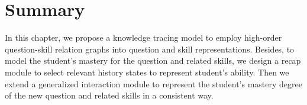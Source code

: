 \section{Summary}
In this chapter, we propose a knowledge tracing model to employ high-order question-skill relation graphs into question and skill representations. Besides, to model the student's mastery for the question and related skills, we design a recap module to select relevant history states to represent student's ability. Then we extend a generalized interaction module to represent the student's mastery degree of the new question and related skills in a consistent way.
